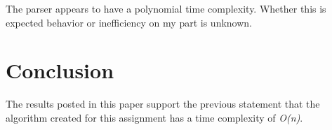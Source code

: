 \documentclass[journal]{IEEEtran}
\begin{document}
The parser appears to have a polynomial time complexity. Whether this is expected behavior or inefficiency on my part is unknown. 


\section{Conclusion}

The results posted in this paper support the previous statement that the algorithm created for this assignment has a time complexity of \textit{O(n)}.




\end{document}
